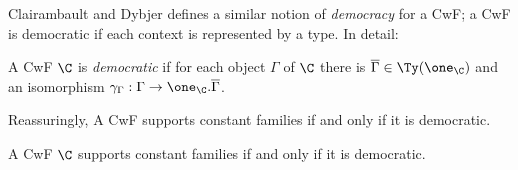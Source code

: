 \documentclass{article}
\begin{document}
Clairambault and Dybjer \cite{clairambaultDybjer2011lcccML} defines a
similar notion of \emph{democracy} for a CwF; a CwF is democratic if
each context is represented by a type. In detail:

\begin{definition}
  A CwF $\C$ is \emph{democratic} if for each object $\Gamma$ of $\C$
  there is $\overline{\Gamma} \in \Ty(\one_{\C})$ and an isomorphism
  $\gamma_{\Gamma} : \Gamma \to \one_{\C}.\overline{\Gamma}$.
\end{definition}

Reassuringly, A CwF supports constant families if and only if it is democratic.

\begin{proposition}
  A CwF $\C$ supports constant families if and only if it is democratic.
\end{proposition}
\end{document}
